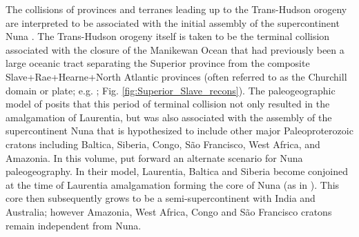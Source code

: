 \documentclass[twocolumn, switch]{article} %
\begin{document}
The collisions of provinces and terranes leading up to the Trans-Hudson orogeny are interpreted to be associated with the initial assembly of the supercontinent Nuna \citep{Zhang2012a,Pehrsson2015a}. The Trans-Hudson orogeny itself is taken to be the terminal collision associated with the closure of the Manikewan Ocean that had previously been a large oceanic tract separating the Superior province from the composite Slave+Rae+Hearne+North Atlantic provinces (often referred to as the Churchill domain or plate; e.g. \citealp{Skipton2016a, Weller2017a}; Fig. \ref{fig:Superior_Slave_recons}). The paleogeographic model of \cite{Pehrsson2015a} posits that this period of terminal collision not only resulted in the amalgamation of Laurentia, but was also associated with the assembly of the supercontinent Nuna that is hypothesized to include other major Paleoproterozoic cratons including Baltica, Siberia, Congo, S\~ao Francisco, West Africa, and Amazonia. In this volume, \cite{Elming2021a} put forward an alternate scenario for Nuna paleogeography. In their model,  Laurentia, Baltica and Siberia become conjoined at the time of Laurentia amalgamation forming the core of Nuna (as in \citealp{Evans2011a}). This core then subsequently grows to be a semi-supercontinent with India and Australia; however Amazonia, West Africa, Congo and S\~ao Francisco cratons remain independent from Nuna.
\end{document}

